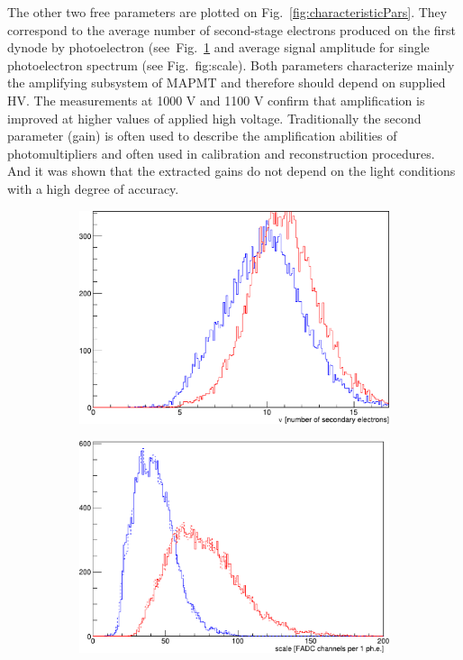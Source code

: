 \documentclass[5p,times,preprint]{elsarticle}
\begin{document}
The other two free parameters are plotted on Fig.~\ref{fig:characteristicPars}.
They correspond to the average number of second-stage electrons produced on the first dynode by photoelectron (see~Fig.~\ref{fig:nu} and average signal amplitude for single photoelectron spectrum (see Fig.~{fig:scale}).
Both parameters characterize mainly the amplifying subsystem of MAPMT and therefore should depend on supplied HV.
The measurements at 1000 V and 1100 V confirm that amplification is improved at higher values of applied high voltage.
Traditionally the second parameter (gain) is often used to describe the amplification abilities of photomultipliers and often used in calibration and reconstruction procedures.
And it was shown that the extracted gains do not depend on the light conditions with a high degree of accuracy.

\begin{figure}[b]
	\centering
	\begin{subfigure}{0.48\linewidth}
	\includegraphics[width=\linewidth]{nu.pdf}
	\caption{}
	\label{fig:nu}

	\end{subfigure}
	\begin{subfigure}{0.48\linewidth}
	\includegraphics[width=\linewidth]{scale.pdf}
	\caption{}
	\label{fig:scale}
	\end{subfigure}


\end{figure}
\end{document}
